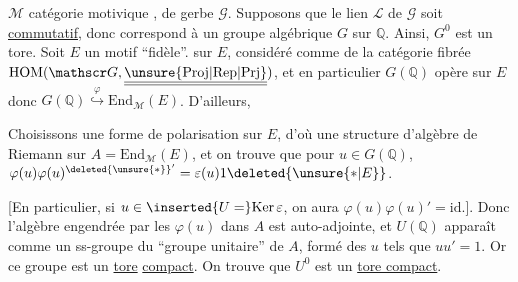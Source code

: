 
$\mathcal M$ catégorie motivique , de gerbe $\mathscr G$. Supposons que le lien $\mathcal L$ de $\mathscr G$ soit \uline{commutatif}, donc correspond à un groupe algébrique  $G$ sur $\mathbb Q$. Ainsi, $G^0$ est un tore. Soit $E$ un motif ``fidèle''.   sur $E$, considéré comme   de la catégorie fibrée $\mathrm{HOM}(\mathscr G,\underline{\underline{\unsure{\mathrm{Proj}|\mathrm{Rep}|\mathrm{Prj}}}})$, et en particulier $G(\mathbb Q)$ opère sur $E$ donc $G(\mathbb Q)\overset{\varphi}{\hookrightarrow}\mathrm{End}_{\mathcal M}(E)$. D'ailleurs,



 Choisissons une forme de polarisation sur $E$, d'où une structure d'algèbre de Riemann sur $A=\mathrm{End}_{\mathcal M}(E)$, et on trouve que pour $u\in G(\mathbb Q)$, $\varphi(u)\varphi(u)^{\deleted{\unsure{*}}'}=\varepsilon(u)1\deleted{\unsure{*|E}}$.

[En particulier, si $u\in\inserted{U=}\mathrm{Ker}\,\varepsilon$, on aura $\varphi(u)\varphi(u)'=\mathrm{id}$.]. Donc l'algèbre engendrée par les $\varphi(u)$ dans $A$ est auto-adjointe, et $U(\mathbb Q)$ apparaît comme un ss-groupe du ``groupe unitaire'' de $A$, formé des $u$ tels que $uu'=1$.  Or ce  groupe est  un \uline{tore} \uline{compact}. On trouve que $U^0$ est un \uline{tore compact}.

